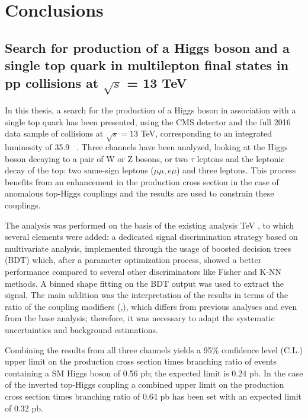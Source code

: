 \chapter{Conclusions}
\label{ch:Conclusions}

\section[Search for production of a Higgs boson and a single top quark]{Search for production of a Higgs boson and a single top quark in multilepton final states in pp collisions at $\sqrt{s}$ = 13 TeV}

In this thesis, a search for the production of a Higgs boson in association with a single top quark has been presented, using the CMS detector and the full 2016 data sample of \pp collisions at $\sqrt{s}=13$ TeV, corresponding to an integrated luminosity of 35.9 ~\fbinv. Three channels have been analyzed, looking at the Higgs boson decaying to a pair of W or Z bosons, or two $\tau$ leptons and the leptonic decay of the top: two same-sign leptons ($\mu\mu, e\mu$) and three leptons. This process benefits from an enhancement in the production cross section in the case of anomalous top-Higgs couplings and the results are used to constrain these couplings.

The analysis was performed on the basis of the existing analysis  TeV \cite{CMS_AN_2017-029}, to which several elements were added: a dedicated signal discrimination strategy based on multivariate analysis, implemented through the usage of boosted decision trees (BDT) which, after a parameter optimization process, showed a better performance compared to several other discriminators like Fisher and K-NN methods. A binned shape fitting on the BDT output was used to extract the signal. The main addition was the interpretation of the results in terms of the ratio of the coupling modifiers (\Ct,\CV), which differs from previous \tH analyses and even from the base \ttH analysis; therefore, it was necessary to adapt the systematic uncertainties and background estimations.

Combining the results from all three channels yields a 95\% confidence level (C.L.) upper limit on the production cross section times branching ratio of events containing a SM Higgs boson of 0.56 pb; the expected limit is 0.24 pb. In the case of the inverted top-Higgs coupling a combined upper limit on the production cross section times branching ratio of 0.64 pb has been set with an expected limit of 0.32 pb.  

